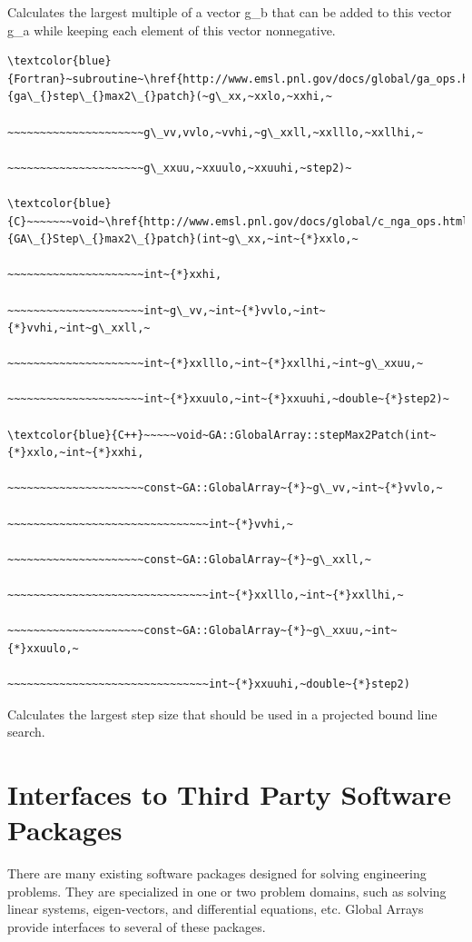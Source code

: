 Calculates the largest multiple of a vector g\_b that can be added
to this vector g\_a while keeping each element of this vector nonnegative. 
\begin{verbatim}
\textcolor{blue}{Fortran}~subroutine~\href{http://www.emsl.pnl.gov/docs/global/ga_ops.html\#ga_step_max2_patch}{ga\_{}step\_{}max2\_{}patch}(~g\_xx,~xxlo,~xxhi,~

~~~~~~~~~~~~~~~~~~~~~g\_vv,vvlo,~vvhi,~g\_xxll,~xxlllo,~xxllhi,~

~~~~~~~~~~~~~~~~~~~~~g\_xxuu,~xxuulo,~xxuuhi,~step2)~

\textcolor{blue}{C}~~~~~~~void~\href{http://www.emsl.pnl.gov/docs/global/c_nga_ops.html\#ga_step_max2_patch}{GA\_{}Step\_{}max2\_{}patch}(int~g\_xx,~int~{*}xxlo,~

~~~~~~~~~~~~~~~~~~~~~int~{*}xxhi,

~~~~~~~~~~~~~~~~~~~~~int~g\_vv,~int~{*}vvlo,~int~{*}vvhi,~int~g\_xxll,~

~~~~~~~~~~~~~~~~~~~~~int~{*}xxlllo,~int~{*}xxllhi,~int~g\_xxuu,~

~~~~~~~~~~~~~~~~~~~~~int~{*}xxuulo,~int~{*}xxuuhi,~double~{*}step2)~

\textcolor{blue}{C++}~~~~~void~GA::GlobalArray::stepMax2Patch(int~{*}xxlo,~int~{*}xxhi,

~~~~~~~~~~~~~~~~~~~~~const~GA::GlobalArray~{*}~g\_vv,~int~{*}vvlo,~

~~~~~~~~~~~~~~~~~~~~~~~~~~~~~~~int~{*}vvhi,~

~~~~~~~~~~~~~~~~~~~~~const~GA::GlobalArray~{*}~g\_xxll,~

~~~~~~~~~~~~~~~~~~~~~~~~~~~~~~~int~{*}xxlllo,~int~{*}xxllhi,~

~~~~~~~~~~~~~~~~~~~~~const~GA::GlobalArray~{*}~g\_xxuu,~int~{*}xxuulo,~

~~~~~~~~~~~~~~~~~~~~~~~~~~~~~~~int~{*}xxuuhi,~double~{*}step2)
\end{verbatim}
Calculates the largest step size that should be used in a projected
bound line search. 


\section{Interfaces to Third Party Software Packages }

There are many existing software packages designed for solving engineering
problems. They are specialized in one or two problem domains, such
as solving linear systems, eigen-vectors, and differential equations,
etc. Global Arrays provide interfaces to several of these packages. 


